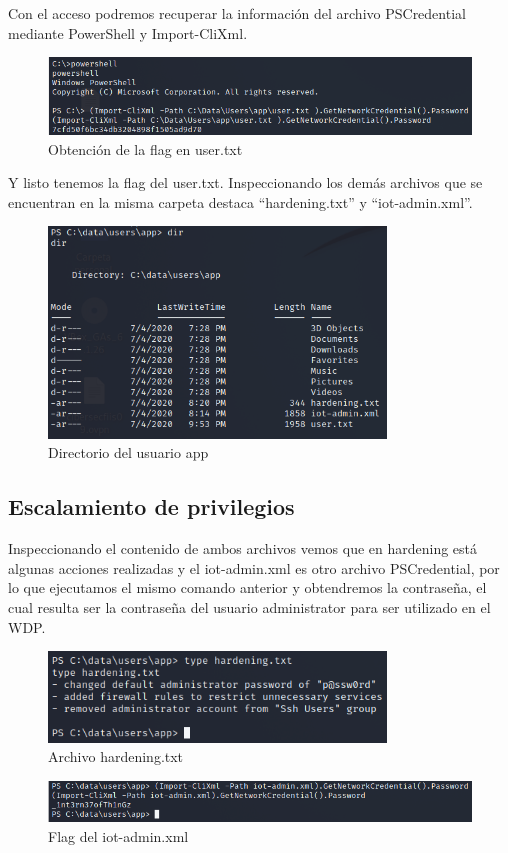 \documentclass{article}
\begin{document}
Con el acceso podremos recuperar la información del archivo PSCredential mediante PowerShell y Import-CliXml.
\begin{figure}[H]
	\center
	\includegraphics[width=\textwidth]{images/omni/24.png}
	\caption{Obtención de la flag en user.txt}
\end{figure}

Y listo tenemos la flag del user.txt. Inspeccionando los demás archivos que se encuentran en la misma carpeta destaca “hardening.txt” y “iot-admin.xml”.
\begin{figure}[H]
	\center
	\includegraphics[width=0.8\textwidth]{images/omni/25.png}
	\caption{Directorio del usuario app}
\end{figure}

\subsection{Escalamiento de privilegios}

Inspeccionando el contenido de ambos archivos vemos que en hardening está algunas acciones realizadas y el iot-admin.xml es otro archivo PSCredential, por lo que ejecutamos el mismo comando anterior y obtendremos la contraseña, el cual resulta ser la contraseña del usuario administrator para ser utilizado en el WDP.
\begin{figure}[H]
	\center
	\includegraphics[width=0.8\textwidth]{images/omni/26.png}
	\caption{Archivo hardening.txt}
\end{figure}
\begin{figure}[H]
	\center
	\includegraphics[width=\textwidth]{images/omni/27.png}
	\caption{Flag del iot-admin.xml}
\end{figure}
\end{document}
